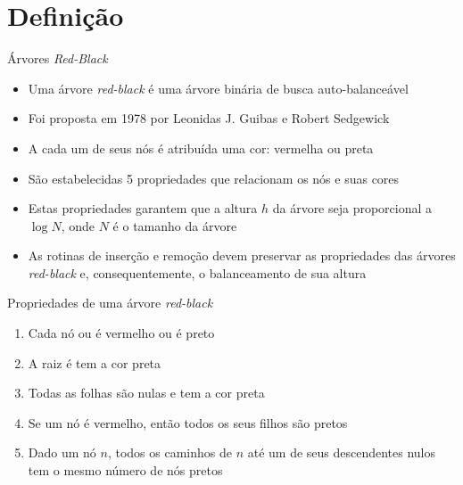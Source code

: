 \section{Definição}

\begin{frame}[fragile]{Árvores \textit{Red-Black}}

	\begin{itemize}
		\item Uma árvore \textit{red-black} é uma árvore binária de busca auto-balanceável

        \item Foi proposta em 1978 por Leonidas J. Guibas e Robert Sedgewick

        \item A cada um de seus nós é atribuída uma cor: vermelha ou preta

        \item São estabelecidas 5 propriedades que relacionam os nós e suas cores

        \item Estas propriedades garantem que a altura $h$ da árvore seja proporcional a
        $\log N$, onde $N$ é o tamanho da árvore

        \item As rotinas de inserção e remoção devem preservar as propriedades das árvores
            \textit{red-black} e, consequentemente, o balanceamento de sua altura
	\end{itemize}

\end{frame} 
 
\begin{frame}[fragile]{Propriedades de uma árvore \textit{red-black}}

    \begin{enumerate}
        \item Cada nó ou é vermelho ou é preto
        \item A raiz é tem a cor preta
        \item Todas as folhas são nulas e tem a cor preta
        \item Se um nó é vermelho, então todos os seus filhos são pretos
        \item Dado um nó $n$, todos os caminhos de $n$ até um de seus descendentes nulos tem o
            mesmo número de nós pretos
    \end{enumerate}

\end{frame}

